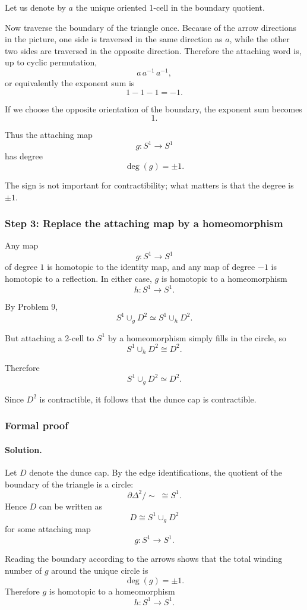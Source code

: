 \documentclass[12pt,a4paper]{article}
\theoremstyle{notespace}
\begin{document}
Let us denote by \(a\) the unique oriented 1-cell in the boundary quotient.

Now traverse the boundary of the triangle once. Because of the arrow directions in the picture, one side is traversed in the same direction as \(a\), while the other two sides are traversed in the opposite direction. Therefore the attaching word is, up to cyclic permutation,
\[
a\,a^{-1}\,a^{-1},
\]
or equivalently the exponent sum is
\[
1-1-1=-1.
\]

If we choose the opposite orientation of the boundary, the exponent sum becomes
\[
1.
\]

Thus the attaching map
\[
g:S^1\to S^1
\]
has degree
\[
\deg(g)=\pm1.
\]

The sign is not important for contractibility; what matters is that the degree is \(\pm1\).

\subsubsection{Step 3: Replace the attaching map by a homeomorphism}

Any map
\[
g:S^1\to S^1
\]
of degree \(1\) is homotopic to the identity map, and any map of degree \(-1\) is homotopic to a reflection. In either case, \(g\) is homotopic to a homeomorphism
\[
h:S^1\to S^1.
\]

By Problem 9,
\[
S^1\cup_g D^2 \simeq S^1\cup_h D^2.
\]

But attaching a 2-cell to \(S^1\) by a homeomorphism simply fills in the circle, so
\[
S^1\cup_h D^2 \cong D^2.
\]

Therefore
\[
S^1\cup_g D^2 \simeq D^2.
\]

Since \(D^2\) is contractible, it follows that the dunce cap is contractible.

\subsubsection{Formal proof}

\paragraph{\textbf{Solution.}}
Let \(D\) denote the dunce cap. By the edge identifications, the quotient of the boundary of the triangle is a circle:
\[
\partial \Delta^2/\!\sim \;\cong S^1.
\]
Hence \(D\) can be written as
\[
D \cong S^1\cup_g D^2
\]
for some attaching map
\[
g:S^1\to S^1.
\]

Reading the boundary according to the arrows shows that the total winding number of \(g\) around the unique circle is
\[
\deg(g)=\pm1.
\]
Therefore \(g\) is homotopic to a homeomorphism
\[
h:S^1\to S^1.
\]
\end{document}
